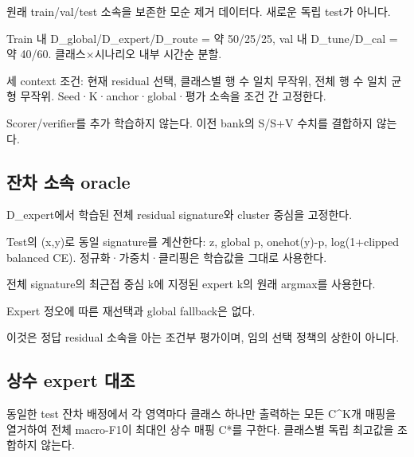 \par\noindent \textbullet\enspace 원래 train/\allowbreak{}val/\allowbreak{}test 소속을 보존한 모순 제거 데이터다. 새로운 독립 test가 아니다.


\par\noindent \textbullet\enspace Train 내 D\_\allowbreak{}global/\allowbreak{}D\_\allowbreak{}expert/\allowbreak{}D\_\allowbreak{}route =\allowbreak{} 약 50/\allowbreak{}25/\allowbreak{}25, val 내 D\_\allowbreak{}tune/\allowbreak{}D\_\allowbreak{}cal =\allowbreak{} 약 40/\allowbreak{}60. 클래스×시나리오 내부 시간순 분할.


\par\noindent \textbullet\enspace 세 context 조건: 현재 residual 선택, 클래스별 행 수 일치 무작위, 전체 행 수 일치 균형 무작위. Seed·K·anchor·global·평가 소속을 조건 간 고정한다.


\par\noindent \textbullet\enspace Scorer/\allowbreak{}verifier를 추가 학습하지 않는다. 이전 bank의 S/\allowbreak{}S+\allowbreak{}V 수치를 결합하지 않는다.


\subsection{잔차 소속 oracle}
\par\noindent \textbullet\enspace D\_\allowbreak{}expert에서 학습된 전체 residual signature와 cluster 중심을 고정한다.


\par\noindent \textbullet\enspace Test의 (x,y)로 동일 signature를 계산한다: z, global p, onehot(y)-p, log(1+\allowbreak{}clipped balanced CE). 정규화·가중치·클리핑은 학습값을 그대로 사용한다.


\par\noindent \textbullet\enspace 전체 signature의 최근접 중심 k에 지정된 expert k의 원래 argmax를 사용한다.


\par\noindent \textbullet\enspace Expert 정오에 따른 재선택과 global fallback은 없다.


이것은 정답 residual 소속을 아는 조건부 평가이며, 임의 선택 정책의 상한이 아니다.

\subsection{상수 expert 대조}
동일한 test 잔차 배정에서 각 영역마다 클래스 하나만 출력하는 모든 C\textasciicircum{}K개 매핑을 열거하여 전체 macro-F1이 최대인 상수 매핑 C*를 구한다. 클래스별 독립 최고값을 조합하지 않는다.

